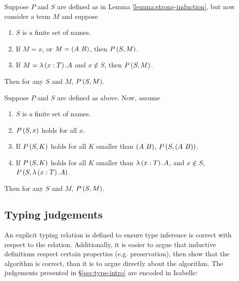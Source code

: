 \begin{lemma}
\label{lemma:strong-cases}
Suppose \(P\) and \(S\) are defined as in Lemma \ref{lemma:strong-induction}, but now consider a term \(M\) and suppose
\begin{enumerate}
\item
\(S\) is a finite set of names.
\item
If \(M = x\), or \(M = \left(A\ B\right)\), then \(P\left(S, M\right)\).
\item
If \(M = \lambda \left(x:T\right). A\) and \(x \notin S\), then \(P\left(S, M\right)\).
\end{enumerate}
Then for any \(S\) and \(M\), \(P\left(S, M\right)\).
\end{lemma}

\begin{lemma}
Suppose \(P\) and \(S\) are defined as above.
Now, assume
\begin{enumerate}
\item
\(S\) is a finite set of names.
\item
\(P\left(S, x\right)\) holds for all \(x\).
\item
If \(P\left(S, K\right)\) holds for all \(K\) smaller than \(\left(A\ B\right)\), \(P\left(S, \left(A\ B\right)\right)\).
\item
If \(P\left(S, K\right)\) holds for all \(K\) smaller than \(\lambda \left(x:T\right). A\), and \(x \notin S\), \(P\left(S, \lambda \left(x:T\right).A\right)\).
\end{enumerate}
Then for any \(S\) and \(M\), \(P\left(S, M\right)\).
\end{lemma}

\subsection{Typing judgements}
\label{sec:typing-judgements}
An explicit typing relation is defined to ensure type inference is correct with respect to the relation.
Additionally, it is easier to argue that inductive definitions respect certain properties (e.g. preservation), then show that the algorithm is correct, than it is to argue directly about the algorithm.
The judgements presented in \S\ref{sec:type-intro} are encoded in Isabelle:

